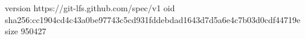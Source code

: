 version https://git-lfs.github.com/spec/v1
oid sha256:cc1904cd4c43a0be97743c5cd931fddebdad1643d7d5a6e4c7b03d0cdf44719e
size 950427
